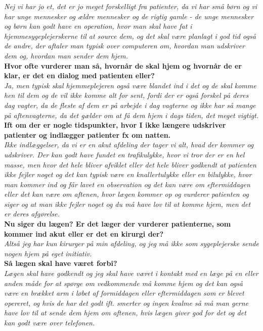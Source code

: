 \noindent
\textit{Nej vi har jo et, det er jo meget forskelligt fra patienter, da vi har små børn og vi har unge mennesker og ældre mennesker og de rigtig gamle - de unge mennesker og børn kan godt have en operation, hvor man skal have fat i hjemmesygeplejerskerne til at source dem, og det skal være planlagt i god tid også de andre, der aftaler man typisk over computeren om, hvordan man udskriver dem og, hvordan man sender dem hjem.}\\
\noindent
\textbf{Hvor ofte vurderer man så, hvornår de skal hjem og hvornår de er klar, er det en dialog med patienten eller?}\\
\noindent
\textit{ Ja, men typisk skal hjemmeplejeren også være blandet ind i det og de skal komme hen til dem og de vil ikke komme alt for sent, fordi der er også forskel på deres dag vagter, da de fleste af dem er på arbejde i dag vagterne og ikke har så mange på aftenvagterne, da det gælder om at få dem hjem i dags tiden, det meget vigtigt.}
\textbf{ Ift om der er nogle tidspunkter, hvor I ikke længere udskriver patienter og indlægger patienter fx om natten.}\\
\noindent
\textit{Ikke indlæggelser, da vi er en akut afdeling der tager vi alt, hvad der kommer og udskriver. Der kan godt have fundet en trafikulykke, hvor vi tror der er en hel masse, men hvor det hele bliver afviklet eller det hele bliver godkendt at patienten ikke fejler noget og det kan typisk være en knallertulykke eller en bilulykke, hvor man kommer ind og får lavet en observation og det kan være om eftermiddagen eller det kan være om aftenen, hvor lægen kommer op og vurderer patienten og siger og at man ikke fejler noget og du må have lov til at komme hjem, men det er deres afgørelse.}\\
\noindent
\textbf{Nu siger du lægen? Er det læger der vurderer patienterne, som kommer ind akut eller er det en kirurgi der?}\\
\noindent
\textit{Altså jeg har kun kirurger på min afdeling, og jeg må ikke som sygeplejerske sende nogen hjem på eget initiativ.}\\
\noindent
\textbf{Så lægen skal have været forbi?}\\
\noindent
\textit{Lægen skal have godkendt og jeg skal have været i kontakt med en læge på en eller anden måde for at spørge om vedkommende må komme hjem og det kan også være en brækket arm i løbet af formiddagen eller eftermiddagen som er blevet opereret, og hvis de har det godt ift. smerter og ingen kvalme så må man gerne have lov til at sende dem hjem om aftenen, hvis lægen giver god for det og det kan godt være over telefonen.}\\
